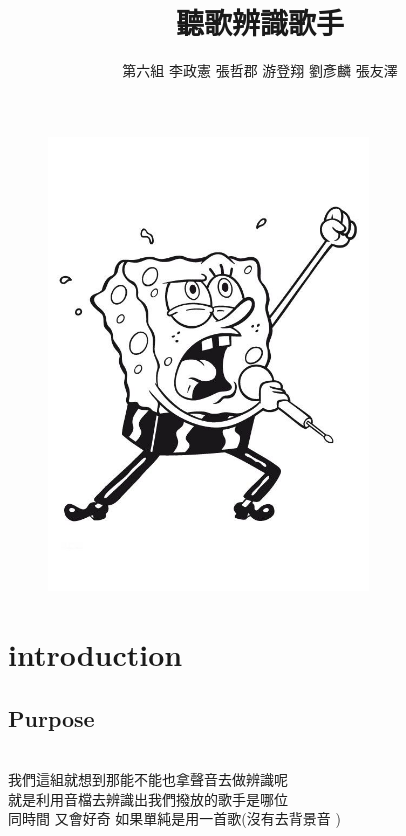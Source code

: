 \documentclass{article}
\begin{document}
\begin{CJK}{UTF8}{bkai}
\title{\Huge \color{blue} 聽歌辨識歌手 }
\author{第六組   李政憲 張哲郡 游登翔 劉彥麟 張友澤}
\maketitle
\begin{figure}[h]
\begin{center}
\includegraphics[width=8.5cm]{sing.jpg}
\end{center}
\label{fig:1}
\end{figure}
\newpage
\section{\huge \bf \color{blue}  introduction\\}

\subsection{\Large Purpose\\}
\\ 我們這組就想到那能不能也拿聲音去做辨識呢\\ 就是利用音檔去辨識出我們撥放的歌手是哪位
\\同時間 又會好奇 如果單純是用一首歌(沒有去背景音 )\\
\\


\end{CJK}
\end{document}
